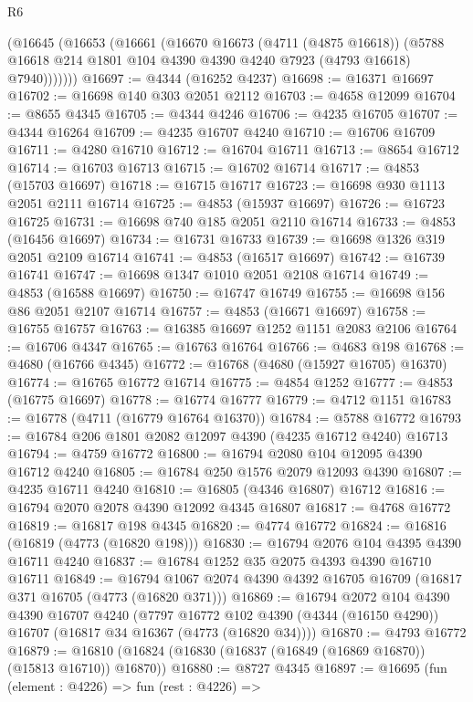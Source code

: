 \begin{lexlean}{R6}
\begin{coremodule}
        (@16645
          (@16653
            (@16661
              (@16670
                @16673
                (@4711 (@4875 @16618))
                (@5788 @16618 @214 @1801 @104 @4390 @4390 @4240 @7923 (@4793 @16618) @7940)))))))
@16697 := @4344 (@16252 @4237)
@16698 := @16371 @16697
@16702 := @16698 @140 @303 @2051 @2112
@16703 := @4658 @12099
@16704 := @8655 @4345
@16705 := @4344 @4246
@16706 := @4235 @16705
@16707 := @4344 @16264
@16709 := @4235 @16707 @4240
@16710 := @16706 @16709
@16711 := @4280 @16710
@16712 := @16704 @16711
@16713 := @8654 @16712
@16714 := @16703 @16713
@16715 := @16702 @16714
@16717 := @4853 (@15703 @16697)
@16718 := @16715 @16717
@16723 := @16698 @930 @1113 @2051 @2111 @16714
@16725 := @4853 (@15937 @16697)
@16726 := @16723 @16725
@16731 := @16698 @740 @185 @2051 @2110 @16714
@16733 := @4853 (@16456 @16697)
@16734 := @16731 @16733
@16739 := @16698 @1326 @319 @2051 @2109 @16714
@16741 := @4853 (@16517 @16697)
@16742 := @16739 @16741
@16747 := @16698 @1347 @1010 @2051 @2108 @16714
@16749 := @4853 (@16588 @16697)
@16750 := @16747 @16749
@16755 := @16698 @156 @86 @2051 @2107 @16714
@16757 := @4853 (@16671 @16697)
@16758 := @16755 @16757
@16763 := @16385 @16697 @1252 @1151 @2083 @2106
@16764 := @16706 @4347
@16765 := @16763 @16764
@16766 := @4683 @198
@16768 := @4680 (@16766 @4345)
@16772 := @16768 (@4680 (@15927 @16705) @16370)
@16774 := @16765 @16772 @16714
@16775 := @4854 @1252
@16777 := @4853 (@16775 @16697)
@16778 := @16774 @16777
@16779 := @4712 @1151
@16783 := @16778 (@4711 (@16779 @16764 @16370))
@16784 := @5788 @16772
@16793 := @16784 @206 @1801 @2082 @12097 @4390 (@4235 @16712 @4240) @16713
@16794 := @4759 @16772
@16800 := @16794 @2080 @104 @12095 @4390 @16712 @4240
@16805 := @16784 @250 @1576 @2079 @12093 @4390
@16807 := @4235 @16711 @4240
@16810 := @16805 (@4346 @16807) @16712
@16816 := @16794 @2070 @2078 @4390 @12092 @4345 @16807
@16817 := @4768 @16772
@16819 := @16817 @198 @4345
@16820 := @4774 @16772
@16824 := @16816 (@16819 (@4773 (@16820 @198)))
@16830 := @16794 @2076 @104 @4395 @4390 @16711 @4240
@16837 := @16784 @1252 @35 @2075 @4393 @4390 @16710 @16711
@16849 := @16794 @1067 @2074 @4390 @4392 @16705 @16709 (@16817 @371 @16705 (@4773 (@16820 @371)))
@16869 := @16794
    @2072
    @104
    @4390
    @4390
    @16707
    @4240
    (@7797 @16772 @102 @4390 (@4344 (@16150 @4290)) @16707 (@16817 @34 @16367 (@4773 (@16820 @34))))
@16870 := @4793 @16772
@16879 := @16810 (@16824 (@16830 (@16837 (@16849 (@16869 @16870)) (@15813 @16710)) @16870))
@16880 := @8727 @4345
@16897 := @16695
    (fun (element : @4226) =>
    fun (rest : @4226) =>

\end{coremodule}
\end{lexlean}
